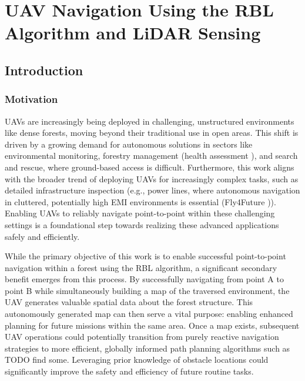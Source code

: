 \chapter{UAV Navigation Using the RBL Algorithm and LiDAR Sensing\label{chap:lidar}}

    \section{Introduction}
        \subsection{Motivation}
        \ac{UAV}s are increasingly being deployed in challenging, unstructured environments like dense forests, moving beyond their traditional use in open areas.
        This shift is driven by a growing demand for autonomous solutions in sectors like environmental monitoring, forestry management (health assessment \cite{kurovec_fel_clanek}), and search and rescue, where ground-based access is difficult. 
        Furthermore, this work aligns with the broader trend of deploying \ac{UAV}s for increasingly complex tasks, such as detailed infrastructure inspection (e.g., power lines, where autonomous navigation in cluttered, potentially high \ac{EMI} environments is essential (Fly4Future \cite{f4f_powerline_inspection})). 
        Enabling UAVs to reliably navigate point-to-point within these challenging settings is a foundational step towards realizing these advanced applications safely and efficiently.

        While the primary objective of this work is to enable successful point-to-point navigation within a forest using the \ac{RBL} algorithm, a significant secondary benefit emerges from this process. 
        By successfully navigating from point A to point B while simultaneously building a map of the traversed environment, the UAV generates valuable spatial data about the forest structure. 
        This autonomously generated map can then serve a vital purpose: enabling enhanced planning for future missions within the same area. 
        Once a map exists, subsequent UAV operations could potentially transition from purely reactive navigation strategies to more efficient, globally informed path planning algorithms such as TODO find some. 
        Leveraging prior knowledge of obstacle locations could significantly improve the safety and efficiency of future routine tasks.
        
